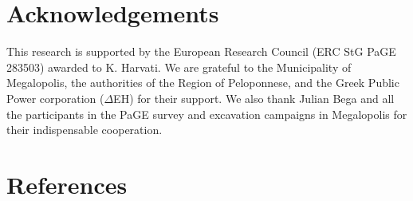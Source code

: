 \documentclass[preprint,authoryear,times]{elsarticle} %
\begin{document}
\section*{Acknowledgements}

This research is supported by the European Research Council (ERC StG PaGE 283503) awarded to K. Harvati. We are grateful to the Municipality of Megalopolis, the authorities of the Region of Peloponnese, and the Greek Public Power corporation ($\Delta$EH) for their support. We also thank Julian Bega and all the participants in the PaGE survey and excavation campaigns in Megalopolis for their indispensable cooperation. %
 
\section*{References}



\end{document}
